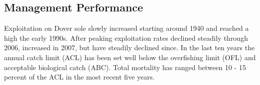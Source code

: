 \documentclass[11pt,
  english,
  a4paper,
]{article}
\begin{document}
\leavevmode\tagmcend\tagstructend\par




\hypertarget{management-performance}{%
\subsection*{Management Performance}\label{management-performance}}

\leavevmode\tagmcend\tagstructend


Exploitation on Dover sole slowly increased starting around 1940 and reached a high the early 1990s. After peaking exploitation rates declined steadily through 2006, increased in 2007, but have steadily declined since. In the last ten years the annual catch limit (ACL) has been set well below the overfishing limit (OFL) and acceptable biological catch (ABC). Total mortality has ranged between 10 - 15 percent of the ACL in the most recent five years.

\leavevmode\tagmcend\tagstructend\par

\begingroup\fontsize{10}{12}\selectfont
\begingroup\fontsize{10}{12}\selectfont
\end{document}
